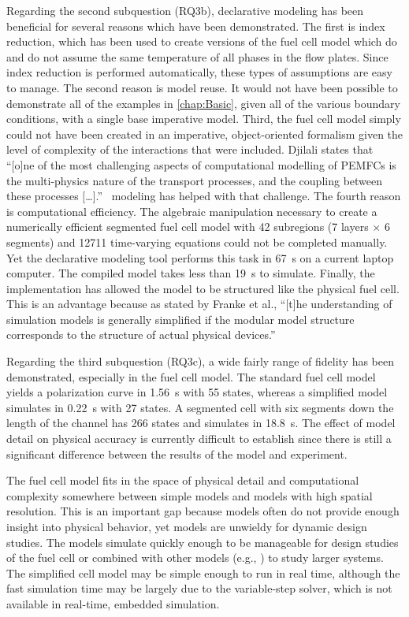 Regarding the second subquestion (RQ3b), declarative modeling has been beneficial for several reasons which have been demonstrated.  The first is index reduction, which has been used to create versions of the fuel cell model which do and do not assume the same temperature of all phases in the flow plates.  Since index reduction is performed automatically, these types of assumptions are easy to manage.  The second reason is model reuse.  It would not have been possible to demonstrate all of the examples in \autoref{chap:Basic}, given all of the various boundary conditions, with a single base imperative model.  Third, the fuel cell model simply could not have been created in an imperative, object-oriented formalism given the level of complexity of the interactions that were included.  Djilali states that ``[o]ne of the most challenging aspects of computational modelling of PEMFCs is the multi-physics nature of the transport processes, and the coupling between these processes [\dots].''~\cite{Djilali2007}   modeling has helped with that challenge.  The fourth reason is computational efficiency.  The algebraic manipulation necessary to create a numerically efficient segmented fuel cell model with 42 subregions (7 layers $\times$ 6 segments) and \num{12711} time-varying equations could not be completed manually.  Yet the declarative modeling tool performs this task in \SI{67}{s} on a current laptop computer.   The compiled model takes less than \SI{19}{s} to simulate.  Finally, the  implementation has allowed the model to be structured like the physical fuel cell.  This is an advantage because as stated by Franke et al., ``[t]he understanding of simulation models is generally simplified if the modular model structure corresponds to the structure of actual physical devices.''~\cite{Franke2009}

Regarding the third subquestion (RQ3c), a wide fairly range of fidelity has been demonstrated, especially in the fuel cell model.  The standard fuel cell model yields a polarization curve in \SI{1.56}{s} with 55 states, whereas a simplified model simulates in \SI{0.22}{s} with 27 states.  A segmented cell with six segments down the length of the channel has 266 states and simulates in \SI{18.8}{s}.  The effect of model detail on physical accuracy is currently difficult to establish since there is still a significant difference between the results of the model and experiment.

The fuel cell model fits in the space of physical detail and computational complexity somewhere between simple  models and  models with high spatial resolution.  This is an important gap because  models often do not provide enough insight into physical behavior, yet  models are unwieldy for dynamic design studies.  The models simulate quickly enough to be manageable for design studies of the fuel cell or combined with other models (e.g., ) to study larger systems.  The simplified cell model may be simple enough to run in real time, although the fast simulation time may be largely due to the variable-step solver, which is not available in real-time, embedded simulation.  


